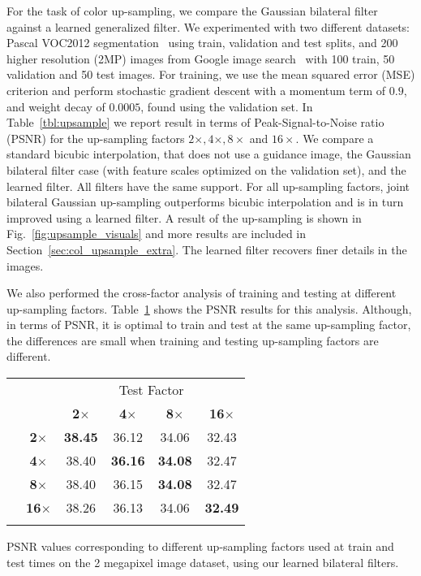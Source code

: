 For the task of color up-sampling, we compare the Gaussian bilateral filter~\cite{kopf2007joint} against
a learned generalized filter. We experimented with two different datasets: Pascal VOC2012 segmentation~\cite{voc2012segmentation}
using train, validation and test splits, and 200 higher resolution (2MP) images from
Google image search~\cite{google_images} with 100 train, 50 validation and 50 test images.
For training, we use the mean
squared error (MSE) criterion and perform stochastic gradient descent with a
momentum term of $0.9$, and weight decay of $0.0005$, found using the validation set.
In Table~\ref{tbl:upsample} we report result in terms of Peak-Signal-to-Noise ratio (PSNR)
for the up-sampling factors $2\times, 4\times, 8\times$ and $16\times$.
We compare a standard bicubic interpolation, that does not use a guidance image, the Gaussian
bilateral filter case (with feature scales optimized on the validation set), and the learned filter.
All filters have the same support.
For all up-sampling factors, joint bilateral Gaussian up-sampling outperforms bicubic interpolation and is in turn improved using a learned filter. A result of the up-sampling is shown in Fig.~\ref{fig:upsample_visuals} and
more results are included in Section~\ref{sec:col_upsample_extra}.
The learned filter recovers finer details in the images.

We also performed the cross-factor analysis of training and testing at different up-sampling
factors. Table~\ref{tbl:crossupsample} shows the PSNR results for this
analysis. Although, in terms of PSNR, it is optimal to train and test at the
same up-sampling factor, the differences are small when training and testing
up-sampling factors are different.

\begin{table}[t]
  \scriptsize
  \centering
    \begin{tabular}{c c c c c c}
      \toprule
      & & \multicolumn{4}{c}{Test Factor} \\ [0.1cm]
     & & \textbf{2$\times$} & \textbf{4$\times$} & \textbf{8$\times$} & \textbf{16$\times$} \\ [0.15cm]
    \parbox[t]{3mm}{} & \textbf{2$\times$} & \textbf{38.45} & 36.12  & 34.06 & 32.43 \\ [0.1cm]
     & \textbf{4$\times$} & 38.40 & \textbf{36.16} & \textbf{34.08} & 32.47 \\ [0.1cm]
     & \textbf{8$\times$} & 38.40 & 36.15  & \textbf{34.08} & 32.47 \\ [0.1cm]
     & \textbf{16$\times$} & 38.26 & 36.13  & 34.06 & \textbf{32.49} \\
      \bottomrule
      \\
    \end{tabular}
      \vspace{-0.2cm}
     {PSNR values corresponding to different up-sampling factors used at train and test times on the 2 megapixel image dataset, using our learned bilateral filters.}
\label{tbl:crossupsample}
\vspace{-0.4cm}
\end{table}

